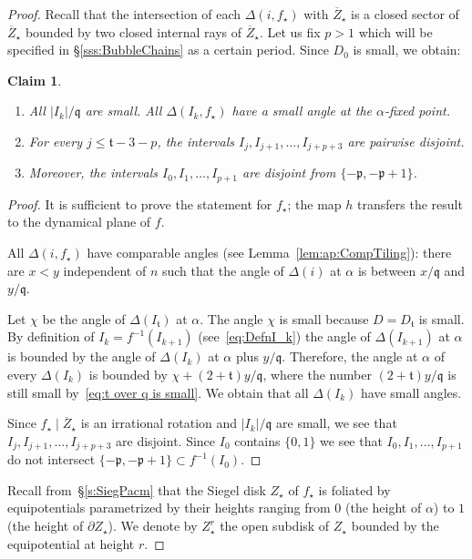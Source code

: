 \documentclass[]{amsart}
\newcommand{\str}{{\star}}
\newcommand{\pp}{\mathfrak{p}}
\renewcommand{\qq}{\mathfrak{q}}
\renewcommand{\tt}{\mathfrak{t}}
\newtheorem{claim}{Claim}
\theoremstyle{remark}
\numberwithin{equation}{section}
\theoremstyle{definition}
\begin{document}
\begin{proof}
 Recall that the intersection of each $\Delta(i, f_\str)$ with $\overline Z_\str$ is a closed sector of $\overline Z_\str$ bounded by two closed internal rays of $\overline Z_\str$. Let us fix $p>1$ which will be specified in \S\ref{sss:BubbleChains} as a certain period.  Since $D_0$ is small, we obtain:
\begin{claim}
\label{cl:C}  \begin{enumerate}
\item All $|I_k| /\qq$ are small. All $\Delta( I_k,f_\str)$ have a small angle at the $\alpha$-fixed point. \label{cl:C:1} 
\item For every $j\le  \tt-3-p$, the intervals $I_j, I_{j+1},\dots ,I_{j+p+3}$ are pairwise disjoint. \label{cl:C:2} 
\item  Moreover, the intervals $I_{0}, I_{1}, \dots, I_{p+1}$  are disjoint from $\{-\pp, -\pp+1\}$.  \label{cl:C:3} 
\end{enumerate}
\end{claim}
\begin{proof}
It is sufficient to prove the statement for $f_\str$; the map $h$ transfers the result to the dynamical plane of $f$.

 All $\Delta(i,f_\str)$ have comparable angles (see Lemma~\ref{lem:ap:CompTiling}): there are $x< y$ independent of $n$ such that the angle of $\Delta(i)$ at $\alpha$ is between $x/\qq$ and $y/\qq$.


Let $\chi$ be the angle of $\Delta(I_{\tt})$ at $\alpha$. The angle $\chi$ is small because $D=D_{\tt}$ is small. By definition of $I_{k}=f^{-1}(I_{k+1})$ (see~\eqref{eq:DefnI_k}) the angle of $\Delta(I_{k+1})$ at $\alpha$ is bounded by the angle of  $\Delta(I_{k})$ at $\alpha$ plus $y/\qq$. Therefore, the angle at $\alpha$ of every $\Delta(I_{k})$ is bounded by $\chi+(2+\tt)y/\qq$, where the number $(2+\tt)y/\qq$ is still small by~\eqref{eq:t over q is small}. We obtain that all $\Delta(I_{k})$ have small  angles.

Since $f_\str\mid \overline Z_\str$ is an irrational rotation and $|I_k|/ \qq$ are small, we see that $I_j, I_{j+1},\dots ,I_{j+p+3}$ are disjoint. Since $I_0$ contains $\{0,1\}$ we see that  $I_{0}, I_{1}, \dots, I_{p+1}$ do not intersect $\{-\pp, -\pp+1\}\subset f^{-1}(I_0)$. 
\end{proof}





Recall from~\S\ref{s:SiegPacm} that the Siegel disk $Z_\str$ of $f_\str$ is foliated by equipotentials parametrized by their heights ranging from $0$ (the height of $\alpha$) to $1$ (the height of $\partial Z_\str$). We denote by $Z_\str^{r}$ the open subdisk of $Z_\str$ bounded by the equipotential at height $r$.


\end{proof}
\end{document}
